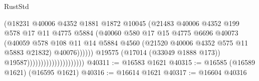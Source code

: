 \begin{lexlean}{RustStd}
\begin{coremodule}
{\begin{coremodule}
{{{{{{{{{{{{{{{{{{{{{{{{{{{{{{{{{{{{{{{{{{{{{{{{{{{{{{{                                                  (@18231
                                                    @40006
                                                    @4352
                                                    @1881
                                                    @1872
                                                    @10045
                                                    (@21483
                                                      @40006
                                                      @4352
                                                      @199
                                                      @578
                                                      @17
                                                      @11
                                                      @4775
                                                      @5884
                                                      (@40060
                                                        @580
                                                        @17
                                                        @15
                                                        @4775
                                                        @6696
                                                        @40073
                                                        (@40059
                                                          @578
                                                          @108
                                                          @11
                                                          @14
                                                          @5884
                                                          @4560
                                                          (@21520
                                                            @40006
                                                            @4352
                                                            @575
                                                            @11
                                                            @5883
                                                            @21832)
                                                          @40076))))))
                                              @19575
                                              (@17014 (@33049 @1888 @173))
                                              @19587)))))))))))))))))))))
@40311 := @16583 @1621
@40315 := @16585 (@16589 @1621) (@16595 @1621)
@40316 := @16614 @1621
@40317 := @16604 @40316
}}}}}}}}}}}}}}}}}}}}}}}}}}}}}}}}}}}}}}}}}}}}}}}}}}}}}}}
\end{coremodule}}
\end{coremodule}
\end{lexlean}
